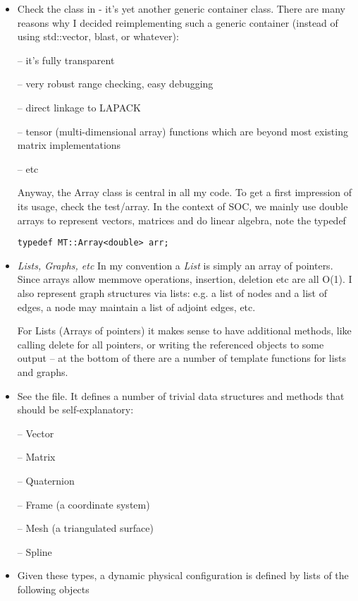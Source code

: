 \begin{itemize}
\item Check the  class in  - it's yet another generic container
class. There are many reasons why I decided reimplementing such a
generic container (instead of using std::vector, blast, or whatever):

-- it's fully transparent

-- very robust range checking, easy debugging

-- direct linkage to LAPACK

-- tensor (multi-dimensional array) functions which are beyond
   most existing matrix implementations

-- etc

Anyway, the Array class is central in all my code. To get a first
impression of its usage, check the test/array. In the context of SOC,
we mainly use double arrays to represent vectors, matrices and do
linear algebra, note the typedef
\begin{lstlisting}
typedef MT::Array<double> arr;
\end{lstlisting}

\item \emph{Lists, Graphs, etc} In my convention a \emph{List} is
simply an array of pointers. Since arrays allow memmove operations,
insertion, deletion etc are all O(1). I also represent graph
structures via lists: e.g. a list of nodes and a list of edges, a node
may maintain a list of adjoint edges, etc.

For Lists (Arrays of pointers) it makes sense to have additional
methods, like calling delete for all pointers, or writing the
referenced objects to some output -- at the bottom of 
there are a number of template functions for lists and graphs.

\item See the  file. It defines a number of trivial data
structures and methods that should be self-explanatory:

-- Vector

-- Matrix

-- Quaternion

-- Frame (a coordinate system)

-- Mesh (a triangulated surface)

-- Spline

\item Given these types, a dynamic physical configuration is
defined by lists of the following objects


\end{itemize}
